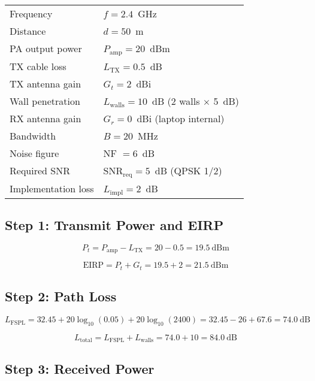 \begin{tabular}{@{}ll@{}}
Frequency & $f = 2.4$~GHz \\
Distance & $d = 50$~m \\
PA output power & $P_{\text{amp}} = 20$~dBm \\
TX cable loss & $L_{\text{TX}} = 0.5$~dB \\
TX antenna gain & $G_t = 2$~dBi \\
Wall penetration & $L_{\text{walls}} = 10$~dB (2 walls $\times$ 5~dB) \\
RX antenna gain & $G_r = 0$~dBi (laptop internal) \\
Bandwidth & $B = 20$~MHz \\
Noise figure & NF $= 6$~dB \\
Required SNR & $\text{SNR}_{\text{req}} = 5$~dB (QPSK 1/2) \\
Implementation loss & $L_{\text{impl}} = 2$~dB \\
\end{tabular}

\subsection*{Step 1: Transmit Power and EIRP}

\begin{equation}
P_t = P_{\text{amp}} - L_{\text{TX}} = 20 - 0.5 = 19.5~\text{dBm}
\end{equation}

\begin{equation}
\text{EIRP} = P_t + G_t = 19.5 + 2 = 21.5~\text{dBm}
\end{equation}

\subsection*{Step 2: Path Loss}

\begin{equation}
L_{\text{FSPL}} = 32.45 + 20\log_{10}(0.05) + 20\log_{10}(2400) = 32.45 - 26 + 67.6 = 74.0~\text{dB}
\end{equation}

\begin{equation}
L_{\text{total}} = L_{\text{FSPL}} + L_{\text{walls}} = 74.0 + 10 = 84.0~\text{dB}
\end{equation}

\subsection*{Step 3: Received Power}


